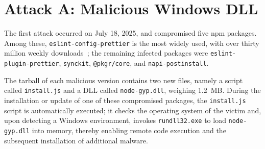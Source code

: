 \section{Attack A: Malicious Windows DLL}
\label{sec:attackA}

The first attack occurred on July 18, 2025, and compromised five \ac{npm} packages.
Among these, \texttt{eslint-config-prettier} is the most widely used,
with over thirty million weekly downloads~\cite{endorlabs2025eslint};
the remaining infected packages were \texttt{eslint-plugin-prettier}, \texttt{synckit}, 
\texttt{@pkgr/core}, and \texttt{napi-postinstall}.

The tarball of each malicious version contains two new files, 
namely a script called \texttt{install.js} and a \ac{DLL} called \texttt{node-gyp.dll}, weighing 1.2~MB.
During the installation or update of one of these compromised packages, the \texttt{install.js} script is automatically executed;
it checks the operating system of the victim and, upon detecting a Windows environment, 
invokes \texttt{rundll32.exe} to load \texttt{node-gyp.dll} into memory, 
thereby enabling remote code execution and the subsequent installation of additional malware.
